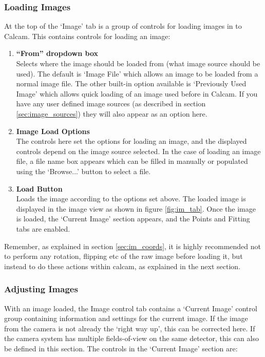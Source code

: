 \documentclass[12pt]{article}
\begin{document}
\subsubsection{Loading Images}
At the top of the `Image' tab is a group of controls for loading images in to Calcam. This contains controls for loading an image:
\begin{enumerate}
\item{\textbf{``From'' dropdown box}\\Selects where the image should be loaded from (what image source should be used). The default is `Image File' which allows an image to be loaded from a normal image file. The other built-in option available is `Previously Used Image' which allows quick loading of an image used before in Calcam. If you have any user defined image sources (as described in section \ref{sec:image_sources}) they will also appear as an option here. }
\item{\textbf{Image Load Options}\\The controls here set the options for loading an image, and the displayed controls depend on the image source selected. In the case of loading an image file, a file name box appears which can be filled in manually or populated using the `Browse...' button to select a file.}
\item{\textbf{Load Button}\\Loads the image according to the options set above. The loaded image is displayed in the image view as shown in figure \ref{fig:im_tab}. Once the image is loaded, the `Current Image' section appears, and the Points and Fitting tabs are enabled.}
\end{enumerate}

Remember, as explained in section \ref{sec:im_coords}, it is highly recommended not to perform any rotation, flipping etc of the raw image before loading it, but instead to do these actions within calcam, as explained in the next section.

\subsubsection{Adjusting Images}

With an image loaded, the Image control tab contains a `Current Image' control group containing information and settings for the current image. If the image from the camera is not already the `right way up', this can be corrected here. If the camera system has multiple fields-of-view on the same detector, this can also be defined in this section. The controls in the `Current Image' section are:
\end{document}
